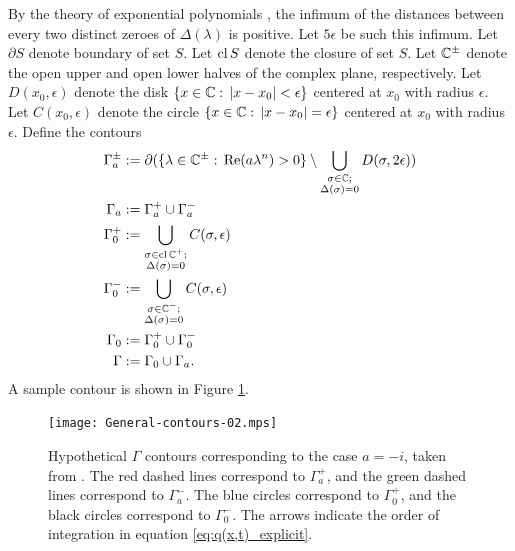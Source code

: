 \documentclass[11pt, oneside, a4paper]{article}
\begin{document}
By the theory of exponential polynomials \cite{Langer1931}, the infimum of the distances between every two distinct zeroes of $\Delta(\lambda)$ is positive. Let $5\epsilon$ be such this infimum. Let $\partial S$ denote boundary of set $S$. Let $\operatorname{cl}{S}$ denote the closure of set $S$. Let $\mathbb C^\pm$ denote the open upper and open lower halves of the complex plane, respectively. Let $D(x_0,\epsilon)$ denote the disk $\{x\in\mathbb C:\, |x-x_0|<\epsilon\}$ centered at $x_0$ with radius $\epsilon$. Let $C(x_0,\epsilon)$ denote the circle $\{x\in\mathbb C:\, |x-x_0|=\epsilon\}$ centered at $x_0$ with radius $\epsilon$. Define the contours
\begin{subequations}\label{eq:gamma}
    \begin{align}
        \Gamma_a^{\pm} &:= \partial(\{\lambda\in\mathbb C^{\pm}:\, \mathrm{Re}(a\lambda^n)>0\}\setminus \bigcup_{\substack{\sigma\in\mathbb C;\\\Delta(\sigma)=0}} D(\sigma, 2\epsilon))\label{eq:gammaAPlusMinus}\\
        \Gamma_a &:= \Gamma_a^+\cup \Gamma_a^-\\
        \Gamma_0^+ &:= \bigcup_{\substack{\sigma\in\operatorname{cl}\mathbb C^+;\\ \Delta(\sigma)=0}} C(\sigma, \epsilon)\label{eq:gamma0Plus}\\
        \Gamma_0^- &:= \bigcup_{\substack{\sigma\in\mathbb C^-;\\ \Delta(\sigma)=0}} C(\sigma, \epsilon)\label{eq:gamma0Minus}\\
        \Gamma_0 &:= \Gamma_0^+\cup \Gamma_0^-\\
        \Gamma &:= \Gamma_0\cup \Gamma_a.
    \end{align}
\end{subequations}
A sample contour is shown in Figure \ref{fig:gamma_smith_fokas}.

\begin{figure}[htpb!]
    \centering
    \texttt{[image: General-contours-02.mps]}
    \caption{Hypothetical $\Gamma$ contours corresponding to the case $a=-i$, taken from \cite{Smith2016}. The red dashed lines correspond to $\Gamma_a^+$, and the green dashed lines correspond to $\Gamma_a^-$. The blue circles correspond to $\Gamma_0^+$, and the black circles correspond to $\Gamma_0^-$. The arrows indicate the order of integration in equation \eqref{eq:q(x,t)_explicit}.}
    \label{fig:gamma_smith_fokas}
\end{figure}
\end{document}
